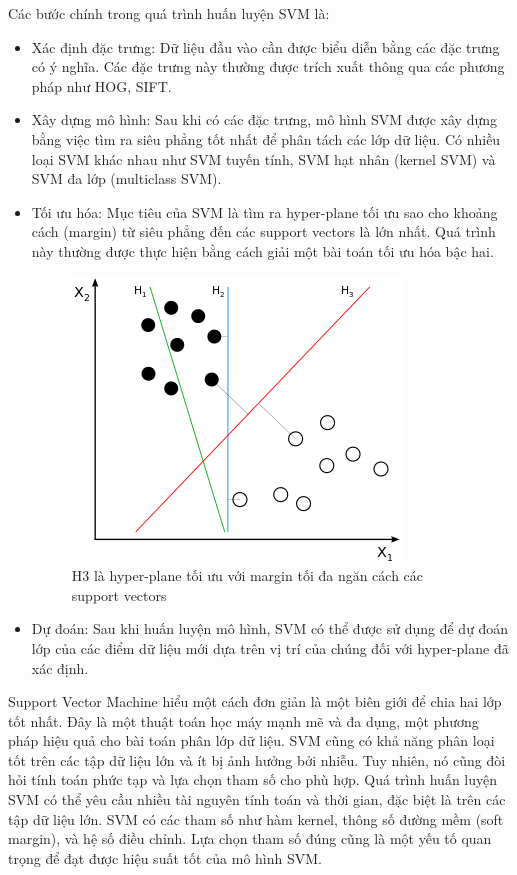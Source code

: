 Các bước chính trong quá trình huấn luyện SVM là:
\begin{itemize}[noitemsep, topsep=0pt, leftmargin=1.25em, label={$-$}]
    \item Xác định đặc trưng: Dữ liệu đầu vào cần được biểu diễn bằng các đặc trưng có ý nghĩa. Các đặc trưng này thường được trích xuất thông qua các phương pháp như HOG, SIFT.
    \item Xây dựng mô hình: Sau khi có các đặc trưng, mô hình SVM được xây dựng bằng việc tìm ra siêu phẳng tốt nhất để phân tách các lớp dữ liệu. Có nhiều loại SVM khác nhau như SVM tuyến tính, SVM hạt nhân (kernel SVM) và SVM đa lớp (multiclass SVM).
    \item Tối ưu hóa: Mục tiêu của SVM là tìm ra hyper-plane tối ưu sao cho khoảng cách (margin) từ siêu phẳng đến các support vectors là lớn nhất. Quá trình này thường được thực hiện bằng cách giải một bài toán tối ưu hóa bậc hai.
    \graphicspath{{figures/}}
    \begin{figure}[h!]
      \centering
      \includegraphics[scale=0.6]{graphics/Svm_separating_hyperplanes.png}
      \caption{H3 là hyper-plane tối ưu với margin tối đa ngăn cách các support vectors}
    \end{figure}
    \item Dự đoán: Sau khi huấn luyện mô hình, SVM có thể được sử dụng để dự đoán lớp của các điểm dữ liệu mới dựa trên vị trí của chúng đối với hyper-plane đã xác định.
\end{itemize}    
Support Vector Machine hiểu một cách đơn giản là một biên giới để chia hai lớp tốt nhất. Đây là một thuật toán học máy mạnh mẽ và đa dụng, một phương pháp hiệu quả cho bài toán phân lớp dữ liệu. SVM cũng có khả năng phân loại tốt trên các tập dữ liệu lớn và ít bị ảnh hưởng bởi nhiễu. Tuy nhiên, nó cũng đòi hỏi tính toán phức tạp và lựa chọn tham số cho phù hợp. Quá trình huấn luyện SVM có thể yêu cầu nhiều tài nguyên tính toán và thời gian, đặc biệt là trên các tập dữ liệu lớn. SVM có các tham số như hàm kernel, thông số đường mềm (soft margin), và hệ số điều chỉnh. Lựa chọn tham số đúng cũng là một yếu tố quan trọng để đạt được hiệu suất tốt của mô hình SVM.